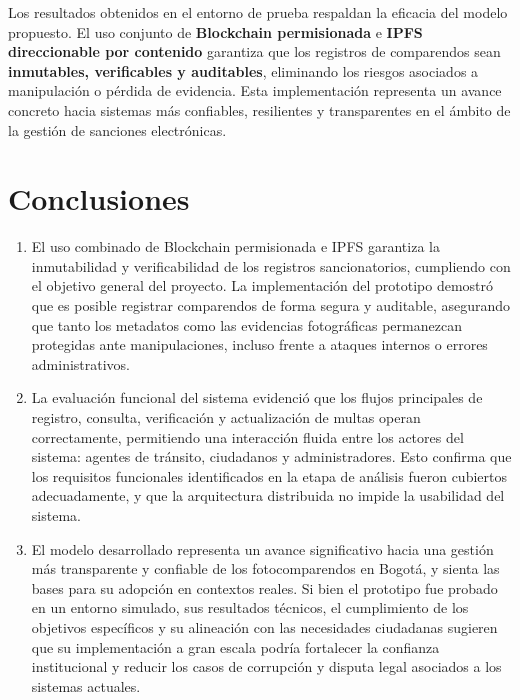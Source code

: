 \documentclass[
    letterpaper, 
    man,   
    spanish,
    12pt,
    donotrepeattitle,
    floatsintext,
    hidelinks %
]{apa7}
\begin{document}
Los resultados obtenidos en el entorno de prueba respaldan la eficacia del modelo propuesto. El uso conjunto de \textbf{Blockchain permisionada} e \textbf{IPFS direccionable por contenido} garantiza que los registros de comparendos sean \textbf{inmutables, verificables y auditables}, eliminando los riesgos asociados a manipulación o pérdida de evidencia. Esta implementación representa un avance concreto hacia sistemas más confiables, resilientes y transparentes en el ámbito de la gestión de sanciones electrónicas.

\section{Conclusiones}
\begin{enumerate}
    \item El uso combinado de Blockchain permisionada e IPFS garantiza la inmutabilidad y verificabilidad de los registros sancionatorios, cumpliendo con el objetivo general del proyecto. La implementación del prototipo demostró que es posible registrar comparendos de forma segura y auditable, asegurando que tanto los metadatos como las evidencias fotográficas permanezcan protegidas ante manipulaciones, incluso frente a ataques internos o errores administrativos.
    \item La evaluación funcional del sistema evidenció que los flujos principales de registro, consulta, verificación y actualización de multas operan correctamente, permitiendo una interacción fluida entre los actores del sistema: agentes de tránsito, ciudadanos y administradores. Esto confirma que los requisitos funcionales identificados en la etapa de análisis fueron cubiertos adecuadamente, y que la arquitectura distribuida no impide la usabilidad del sistema.
    \item El modelo desarrollado representa un avance significativo hacia una gestión más transparente y confiable de los fotocomparendos en Bogotá, y sienta las bases para su adopción en contextos reales. Si bien el prototipo fue probado en un entorno simulado, sus resultados técnicos, el cumplimiento de los objetivos específicos y su alineación con las necesidades ciudadanas sugieren que su implementación a gran escala podría fortalecer la confianza institucional y reducir los casos de corrupción y disputa legal asociados a los sistemas actuales.
\end{enumerate}



\printbibliography[
    heading=bibintoc,
    title={Referencias}
]
\end{document}
